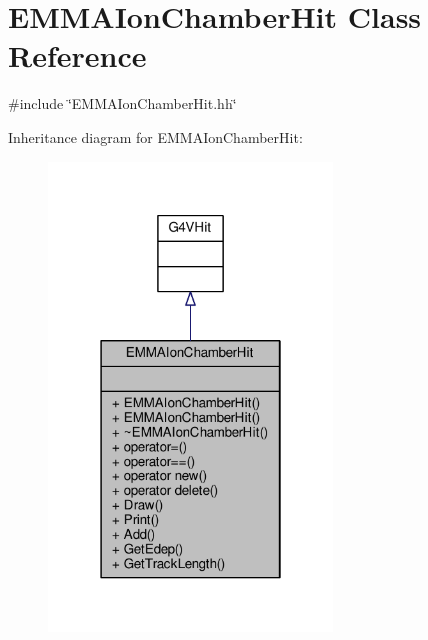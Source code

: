 \hypertarget{classEMMAIonChamberHit}{}\section{E\+M\+M\+A\+Ion\+Chamber\+Hit Class Reference}
\label{classEMMAIonChamberHit}


{\ttfamily \#include \char`\"{}E\+M\+M\+A\+Ion\+Chamber\+Hit.\+hh\char`\"{}}



Inheritance diagram for E\+M\+M\+A\+Ion\+Chamber\+Hit\+:
\nopagebreak
\begin{figure}[H]
\begin{center}
\leavevmode
\includegraphics[width=214pt]{classEMMAIonChamberHit__inherit__graph}
\end{center}
\end{figure}


